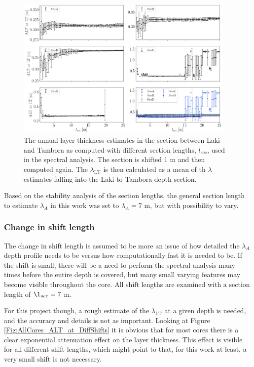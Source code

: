 \documentclass[../../CompleteThesis2/Complete_2ndDraft]{subfiles}
\begin{document}
\begin{figure}[h]
	\centering
	\includegraphics[width=0.95\textwidth]{AllCores_ALTatLT_vs_lSec.png}
	\caption[$\lambda_{\text{LT}}$ vs. Section Length]{\small The annual layer thickness estimates in the section between Laki and Tambora as computed with different section lengths, $l_{\text{sec}}$, used in the spectral analysis. The section is shifted 1 m and then computed again. The $\lambda_{\text{LT}}$ is then calculated as a mean of th $\lambda$ estimates falling into the Laki to Tambora depth section.}
	\label{fig:AllCores_ALTatLT_vs_lSec}
\end{figure}

Based on the stability analysis of the section lengths, the general section length to estimate $\lambda_A$ in this work was set to $\lambda_A=7$ m, but with possibility to vary.


\subsubsection[Change in $l_{shift}$]{Change in shift length}
\label{Subsubsec:SignalAnalysis_SpectralAnalysis_ALT_lshift}
The change in shift length is assumed to be more an issue of how detailed the $\lambda_A$ depth profile needs to be versus how computationally fast it is needed to be. If the shift is small, there will be a need to perform the spectral analysis many times before the entire depth is covered, but many small varying features may become visible throughout the core. All shift lengths are examined with a section length of $\l_{sec}=7$ m.

For this project though, a rough estimate of the $\lambda_{\text{LT}}$ at a given depth is needed, and the accuracy and details is not as important. Looking at Figure \ref{Fig:AllCores_ALT_at_DiffShifts} it is obvious that for most cores there is a clear exponential attenuation effect on the layer thickness. This effect is visible for all different shift lengths, which might point to that, for this work at least, a very small shift is not necessary.
\end{document}
